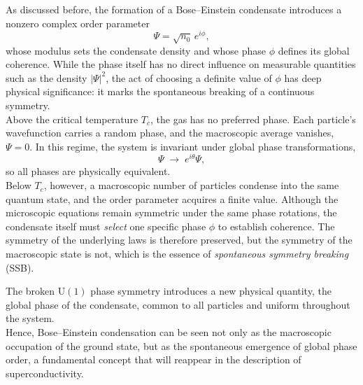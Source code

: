 As discussed before, the formation of a Bose--Einstein condensate introduces a nonzero complex order parameter
\[
\Psi = \sqrt{n_0}\, e^{i\phi},
\]
whose modulus sets the condensate density and whose phase \(\phi\) defines its global coherence.  
While the phase itself has no direct influence on measurable quantities such as the density \(|\Psi|^2\), the act of choosing a definite value of \(\phi\) has deep physical significance: it marks the spontaneous breaking of a continuous symmetry.\\
Above the critical temperature \(T_c\), the gas has no preferred phase.  
Each particle’s wavefunction carries a random phase, and the macroscopic average vanishes, \(\Psi = 0\).  
In this regime, the system is invariant under global phase transformations,
\[
\Psi \;\to\; e^{i\theta}\Psi,
\]
so all phases are physically equivalent.\\
Below \(T_c\), however, a macroscopic number of particles condense into the same quantum state, and the order parameter acquires a finite value.  
Although the microscopic equations remain symmetric under the same phase rotations, the condensate itself must \emph{select} one specific phase \(\phi\) to establish coherence.  
The symmetry of the underlying laws is therefore preserved, but the symmetry of the macroscopic state is not, which is the essence of \textit{spontaneous symmetry breaking} (SSB).

The broken \(\mathrm{U}(1)\) phase symmetry introduces a new physical quantity, the global phase of the condensate, common to all particles and uniform throughout the system.  \\
Hence, Bose--Einstein condensation can be seen not only as the macroscopic occupation of the ground state, but as the spontaneous emergence of global phase order, a fundamental concept that will reappear in the description of superconductivity.


